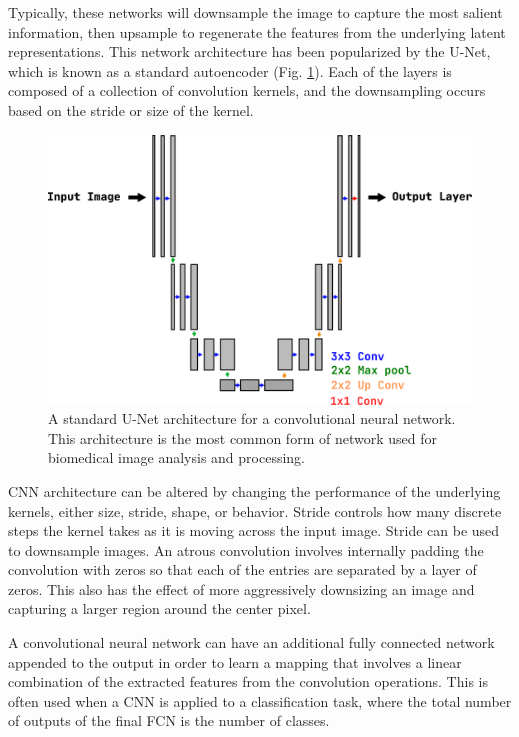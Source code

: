 Typically, these networks will downsample the image to capture the most salient information, then upsample to regenerate the features from the underlying latent representations. This network architecture has been popularized by the U-Net, which is known as a standard autoencoder (Fig. \ref{fig:unet}). Each of the layers is composed of a collection of convolution kernels, and the downsampling occurs based on the stride or size of the kernel.

\begin{figure}[h!]
    \centering
    \includegraphics[width=0.7\linewidth]{figs/background/png/u-net.png}
    \caption{A standard U-Net architecture for a convolutional neural network. This architecture is the most common form of network used for biomedical image analysis and processing.}
    \label{fig:unet}
\end{figure}

CNN architecture can be altered by changing the performance of the underlying kernels, either size, stride, shape, or behavior. Stride controls how many discrete steps the kernel takes as it is moving across the input image. Stride can be used to downsample images. An atrous convolution involves internally padding the convolution with zeros so that each of the entries are separated by a layer of zeros. This also has the effect of more aggressively downsizing an image and capturing a larger region around the center pixel.

A convolutional neural network can have an additional fully connected network appended to the output in order to learn a mapping that involves a linear combination of the extracted features from the convolution operations. This is often used when a CNN is applied to a classification task, where the total number of outputs of the final FCN is the number of classes.